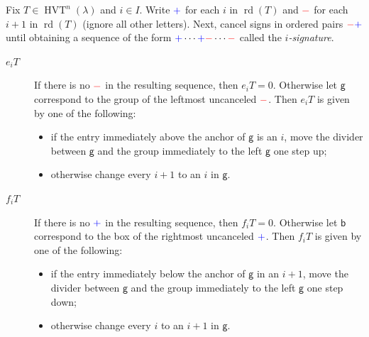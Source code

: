 \documentclass[ALCO,ThmDefs,Unicode,epreuves]{cedram}
\newcommand{\bbb}{\mathsf{b}}
\newcommand{\gp}{\mathsf{g}}
\DeclareMathOperator{\rd}{rd} %
\DeclareMathOperator{\hvt}{HVT} %
\newcommand{\bplus}{{\color{blue}+}}
\newcommand{\bminus}{{\color{red}-}}
\newcommand{\defn}[1]{{\color{darkred}\emph{#1}}} %
\begin{document}
\begin{defi}
Fix $T \in \hvt^n(\lambda)$ and $i \in I$.
Write $\bplus$ for each $i$ in $\rd(T)$ and $\bminus$ for each $i+1$ in $\rd(T)$ (ignore all other letters). 
Next, cancel signs in ordered pairs $\bminus \bplus$ until obtaining a sequence of the form $\bplus \cdots \bplus \bminus \cdots \bminus$ called the \defn{$i$-signature}.

\begin{description}
\item[\defn{$e_i T$}] If there is no $\bminus$ in the resulting sequence, then $e_i T = 0$. Otherwise let $\gp$ correspond to the group of the leftmost uncanceled $\bminus$. Then $e_i T$ is given by one of the following:
\begin{itemize}
\item if the entry immediately above the anchor of $\gp$ is an $i$, move the divider between $\gp$ and the group immediately to the left $\gp$ one step up;
\item otherwise change every $i+1$ to an $i$ in $\gp$.
\end{itemize}

\item[\defn{$f_i T$}] If there is no $\bplus$ in the resulting sequence, then $f_i T = 0$. Otherwise let $\bbb$ correspond to the box of the rightmost uncanceled $\bplus$. Then $f_i T$ is given by one of the following:
\begin{itemize}
\item if the entry immediately below the anchor of $\gp$ in an $i+1$, move the divider between $\gp$ and the group immediately to the left $\gp$ one step down;
\item otherwise change every $i$ to an $i+1$ in $\gp$.
\end{itemize}
\end{description}
\end{defi}
\end{document}
